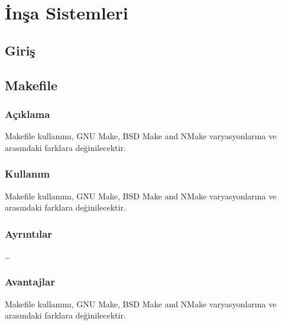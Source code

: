 \documentclass[
]{book}
\begin{document}
\hypertarget{part-inux15fa-sistemleri}{%
\part{İnşa Sistemleri}\label{part-inux15fa-sistemleri}}

\hypertarget{giriux15f-1}{%
\chapter*{Giriş}\label{giriux15f-1}}

\hypertarget{makefile}{%
\chapter*{Makefile}\label{makefile}}

\hypertarget{auxe7ux131klama-1}{%
\section*{Açıklama}\label{auxe7ux131klama-1}}

Makefile kullanımı, GNU Make, BSD Make and NMake varyasyonlarına ve arasındaki farklara değinilecektir.

\hypertarget{kullanux131m}{%
\section*{Kullanım}\label{kullanux131m}}

Makefile kullanımı, GNU Make, BSD Make and NMake varyasyonlarına ve arasındaki farklara değinilecektir.

\hypertarget{ayrux131ntux131lar}{%
\section*{Ayrıntılar}\label{ayrux131ntux131lar}}

\ldots{}

\hypertarget{avantajlar}{%
\section*{Avantajlar}\label{avantajlar}}

Makefile kullanımı, GNU Make, BSD Make and NMake varyasyonlarına ve arasındaki farklara değinilecektir.
\end{document}
